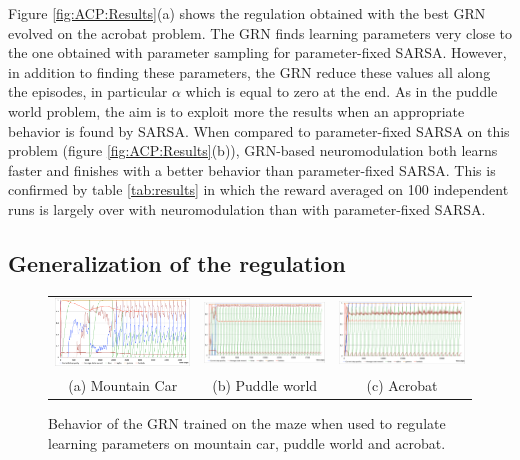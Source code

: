 Figure \ref{fig:ACP:Results}(a) shows the regulation obtained with the best GRN evolved on the acrobat problem. The GRN finds learning parameters very close to the one obtained with parameter sampling for parameter-fixed SARSA. However, in addition to finding these parameters, the GRN reduce these values all along the episodes, in particular $\alpha$ which is equal to zero at the end. As in the puddle world problem, the aim is to exploit more the results when an appropriate behavior is found by SARSA. When compared to parameter-fixed SARSA on this problem (figure \ref{fig:ACP:Results}(b)), GRN-based neuromodulation both learns faster and finishes with a better behavior than parameter-fixed SARSA. This is confirmed by table \ref{tab:results} in which the reward averaged on 100 independent runs is largely over with neuromodulation than with parameter-fixed SARSA. 

\subsection{Generalization of the regulation}

\begin{figure}[t!]
\center
\begin{tabular}{ccc}
\includegraphics[width=0.32\linewidth]{MC_GRNMazeBehavior.pdf} &
\includegraphics[width=0.32\linewidth]{PW_GRNMazeBehavior.pdf} &
\includegraphics[width=0.32\linewidth]{ACP_GRNMazeBehavior.pdf} \\
(a) Mountain Car & (b) Puddle world & (c) Acrobat
\end{tabular}
\caption{Behavior of the GRN trained on the maze when used to regulate learning parameters on mountain car, puddle world and acrobat.}\label{fig:all:GRNMazeBehavior}
\end{figure}

